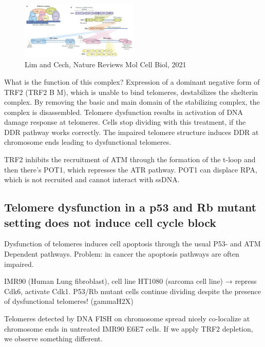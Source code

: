 \begin{figure}
\centering
\includegraphics[width=0.5\textwidth]{../_resources/Screen_Shot_2022-12-15_at_17-43-24.png}
\caption{Lim and Cech, Nature Reviews Mol Cell Biol, 2021}
\end{figure}

What is the function of this complex? Expression of a dominant negative
form of TRF2 (TRF2 B M), which is unable to bind telomeres, destabilizes
the shelterin complex. By removing the basic and main domain of the
stabilizing complex, the complex is disassembled. Telomere dysfunction
results in activation of DNA damage response at telomeres. Cells stop
dividing with this treatment, if the DDR pathway works correctly. The
impaired telomere structure induces DDR at chromosome ends leading to
dysfunctional telomeres.

TRF2 inhibits the recruitment of ATM through the formation of the t-loop
and then there's POT1, which represses the ATR pathway. POT1 can
displace RPA, which is not recruited and cannot interact with ssDNA.

\hypertarget{telomere-dysfunction-in-a-p53-and-rb-mutant-setting-does-not-induce-cell-cycle-block}{%
\subsection{Telomere dysfunction in a p53 and Rb mutant setting does not induce cell cycle block}\label{telomere-dysfunction-in-a-p53-and-rb-mutant-setting-does-not-induce-cell-cycle-block}}

Dysfunction of telomeres induces cell apoptosis through the usual P53-
and ATM Dependent pathways. Problem: in cancer the apoptosis pathways
are often impaired.

IMR90 (Human Lung fibroblast), cell line HT1080 (sarcoma cell line) →
repress Cdk6, activate Cdk1. P53/Rb mutant cells continue dividing
despite the presence of dysfunctional telomeres! (gammaH2X)

Telomeres detected by DNA FISH on chromosome spread nicely co-localize
at chromosome ends in untreated IMR90 E6E7 cells. If we apply TRF2
depletion, we observe something different.

